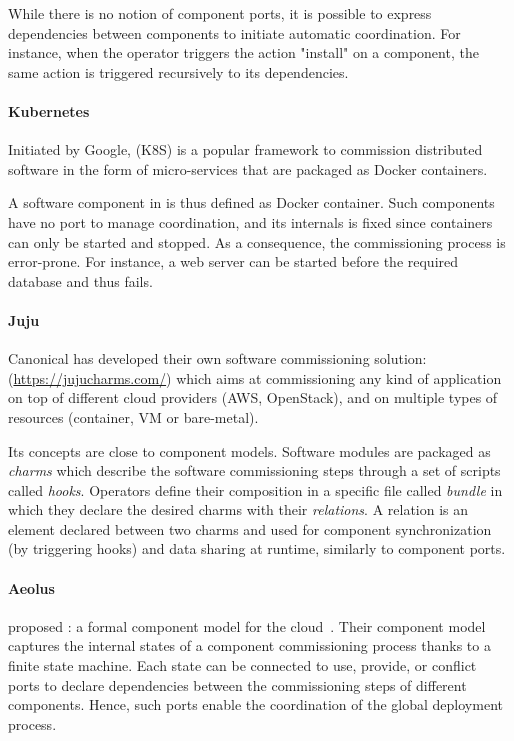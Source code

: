While there is no notion of component ports, it is possible to express
dependencies between components to initiate automatic coordination. For
instance, when the operator triggers the action "install" on a component, the
same action is triggered recursively to its dependencies.

\paragraph{Kubernetes}
Initiated by Google, \kubernetes (K8S) is a popular
framework to commission distributed software in the form of micro-services that
are packaged as Docker containers.

A software component in \kubernetes is thus defined as Docker container. Such
components have no port to manage coordination, and its internals is fixed since
containers can only be started and stopped. As a consequence, the commissioning
process is error-prone. For instance, a web server can be started before the
required database and thus fails.

\paragraph{Juju}
Canonical has developed their own software commissioning solution: \juju
(\url{https://jujucharms.com/}) which aims at commissioning any kind of
application on top of different cloud providers (\eg AWS, OpenStack), and on
multiple types of resources (container, VM or bare-metal).

Its concepts are close to component models. Software modules are packaged as
\juju \emph{charms} which describe the software commissioning steps through a
set of scripts called \emph{hooks}. Operators define their composition in a
specific file called \emph{bundle} in which they declare the desired charms with
their \emph{relations}. A relation is an element declared between two charms and
used for component synchronization (by triggering hooks) and data sharing at
runtime, similarly to component ports.

\paragraph{Aeolus}
\citeauthor{dicosmo2014ic} proposed \aeolus: a formal component model for the
cloud~\cite{dicosmo2014ic}. Their component model captures the internal states
of a component commissioning process thanks to a finite state machine. Each
state can be connected to use, provide, or conflict ports to declare
dependencies between the commissioning steps of different components. Hence,
such ports enable the coordination of the global deployment process.

